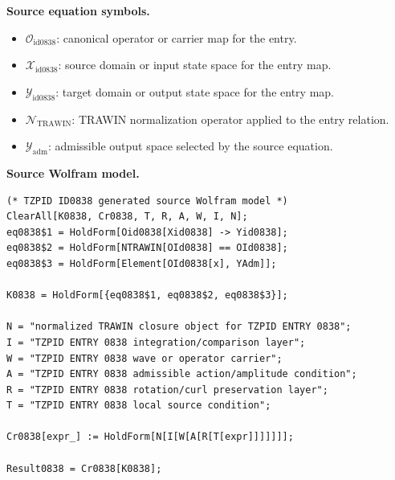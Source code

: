 \begin{minipage}[t]{0.49\linewidth}
\begingroup
\small
\raggedright
\textbf{Source equation symbols.}\par
\begin{itemize}[leftmargin=1.35em,itemsep=1pt,topsep=1pt,parsep=0pt]
    \item $\mathcal{O}_{\mathrm{id0838}}$: canonical operator or carrier map for the entry.
    \item $\mathcal{X}_{\mathrm{id0838}}$: source domain or input state space for the entry map.
    \item $\mathcal{Y}_{\mathrm{id0838}}$: target domain or output state space for the entry map.
    \item $\mathcal{N}_{\mathrm{TRAWIN}}$: TRAWIN normalization operator applied to the entry relation.
    \item $\mathcal{Y}_{\mathrm{adm}}$: admissible output space selected by the source equation.
\end{itemize}
\endgroup
\end{minipage}\hfill
\begin{minipage}[t]{0.47\linewidth}
\begingroup
\scriptsize
\raggedright
\textbf{Source Wolfram model.}\par
\begin{Verbatim}[fontsize=\tiny,breaklines=true,breakanywhere=true]
(* TZPID ID0838 generated source Wolfram model *)
ClearAll[K0838, Cr0838, T, R, A, W, I, N];
eq0838$1 = HoldForm[Oid0838[Xid0838] -> Yid0838];
eq0838$2 = HoldForm[NTRAWIN[OId0838] == OId0838];
eq0838$3 = HoldForm[Element[OId0838[x], YAdm]];

K0838 = HoldForm[{eq0838$1, eq0838$2, eq0838$3}];

N = "normalized TRAWIN closure object for TZPID ENTRY 0838";
I = "TZPID ENTRY 0838 integration/comparison layer";
W = "TZPID ENTRY 0838 wave or operator carrier";
A = "TZPID ENTRY 0838 admissible action/amplitude condition";
R = "TZPID ENTRY 0838 rotation/curl preservation layer";
T = "TZPID ENTRY 0838 local source condition";

Cr0838[expr_] := HoldForm[N[I[W[A[R[T[expr]]]]]]];

Result0838 = Cr0838[K0838];
\end{Verbatim}
\endgroup
\end{minipage}

